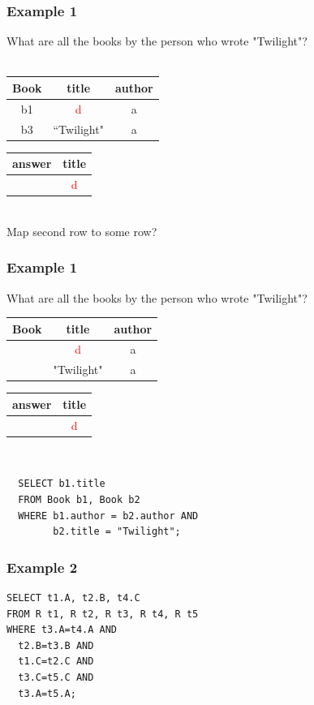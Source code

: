 \documentclass{beamer}
\begin{document}
\begin{frame}
  \frametitle{Example 1}
  What are all the books by the person who wrote "Twilight"?\\
  \hfill \\
  \begin{tabular}{ c | c c }
  Book & title & author \\
  \hline
   b1 & \textcolor{red}{d} & a \\
   b3 & ``Twilight" & a \\
  \end{tabular}
  \begin{tabular}{ c | c}
  answer & title \\
  \hline
   & \textcolor{red}{d}\\
  \end{tabular}
  \hfill \\
  Map second row to some row?
\end{frame}

\begin{frame}[fragile]
  \frametitle{Example 1}
  What are all the books by the person who wrote "Twilight"?\\
  \begin{tabular}{ c | c c }
  Book & title & author \\
  \hline
   & \textcolor{red}{d} & a \\
   & "Twilight" & a \\
  \end{tabular}
  \begin{tabular}{ c | c}
  answer & title \\
  \hline
   & \textcolor{red}{d}\\
  \end{tabular}
  \hfill \\
\begin{verbatim}
  SELECT b1.title
  FROM Book b1, Book b2
  WHERE b1.author = b2.author AND
        b2.title = "Twilight";
\end{verbatim}        
\end{frame}

\begin{frame}[fragile]
  \frametitle{Example 2}
\begin{verbatim}  
SELECT t1.A, t2.B, t4.C
FROM R t1, R t2, R t3, R t4, R t5
WHERE t3.A=t4.A AND
  t2.B=t3.B AND
  t1.C=t2.C AND
  t3.C=t5.C AND
  t3.A=t5.A;
\end{verbatim}  
\end{frame}
\end{document}
